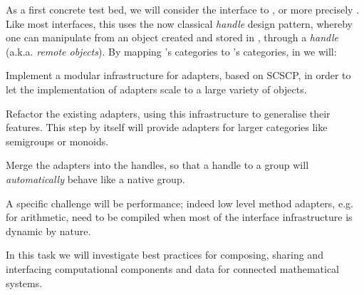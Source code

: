 \begin{workpackage}[id=component-architecture,wphases=0-48!.5,
  title=Component Architecture,lead=UV,
  PSRM=46,UVRM=8,SARM=16, USORM=6, UORM=19, LLRM=14, UJFRM=6, UGRM=14]
\begin{tasklist}
\begin{task}[title=Interfaces between systems,id=interface-systems,lead=PS,PM=22,partners={UV,UO,SA,UG},wphases=0-36,issue=51]
    As a first concrete test bed, we will consider the \Sage interface
    to \GAP, or more precisely \libGAP.  Like most \Sage interfaces,
    this uses the now classical \emph{handle} design pattern, whereby
    one can manipulate from \Sage an object created and stored in
    \GAP, through a \emph{handle} (a.k.a. \emph{remote objects}).  By
    mapping \GAP's categories to \Sage's categories, in
     we
    will:
    \begin{compactitem}
    \item Implement a modular infrastructure for adapters, based on
      SCSCP, in order to let the implementation of adapters scale to a
      large variety of objects.
    \item Refactor the existing adapters, using this infrastructure to
      generalise their features. This step by itself will provide
      adapters for larger categories like semigroups or monoids.
    \item Merge the adapters into the handles, so that a handle to a
      \GAP group will \emph{automatically} behave like a native \Sage
      group.
    \end{compactitem}
    A specific challenge will be performance; indeed low level method
    adapters, e.g. for arithmetic, need to be compiled when most of
    the interface infrastructure is dynamic by nature.

  \end{task}

  \begin{task}[title=Modularisation and packaging,id=mod-packaging,lead=UV,PM=28,partners={PS,LL,UG,UO},wphases=0-48,issue=52]
    In this task we will investigate best practices for composing,
    sharing and interfacing computational components and data for
    connected mathematical systems.


\end{task}
\end{tasklist}
\end{workpackage}
